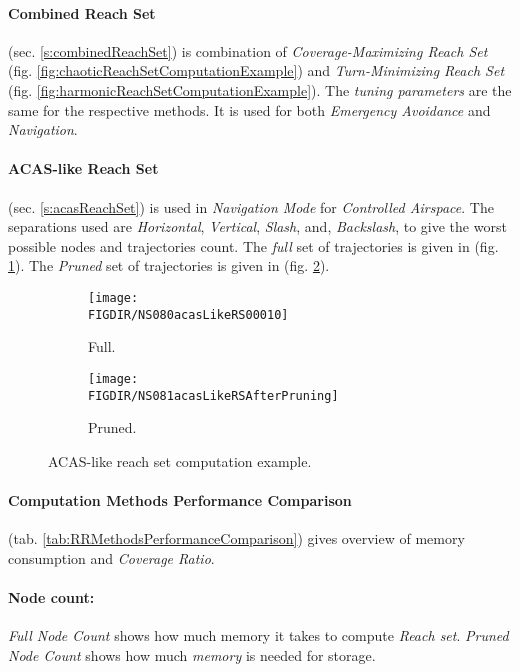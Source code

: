 \paragraph{Combined Reach Set} (sec. \ref{s:combinedReachSet}) is combination of \emph{Coverage-Maximizing Reach Set} (fig. \ref{fig:chaoticReachSetComputationExample}) and \emph{Turn-Minimizing Reach Set} (fig. \ref{fig:harmonicReachSetComputationExample}). The \emph{tuning parameters} are the same for the respective methods. It is used for both \emph{Emergency Avoidance} and \emph{Navigation}. 

\paragraph{ACAS-like Reach Set} (sec. \ref{s:acasReachSet}) is used in \emph{Navigation Mode} for \emph{Controlled Airspace}. The separations used are \emph{Horizontal}, \emph{Vertical}, \emph{Slash}, and, \emph{Backslash}, to give the worst possible nodes and trajectories count. The \emph{full} set of trajectories is given in (fig. \ref{fig:acasLikeComputed}). The \emph{Pruned} set of trajectories is given in (fig. \ref{fig:acasLikePruned}).

\begin{figure}[H]
    \centering
    \begin{subfigure}{0.48\textwidth}
    	\centering
        \texttt{[image: \\FIGDIR/NS080acasLikeRS00010]}
        \caption{Full.}
        \label{fig:acasLikeComputed}
    \end{subfigure}
    \begin{subfigure}{0.48\textwidth}
    	\centering
        \texttt{[image: \\FIGDIR/NS081acasLikeRSAfterPruning]} 
        \caption{Pruned.}
        \label{fig:acasLikePruned}
    \end{subfigure}
    \caption{ACAS-like reach set computation example.}
    \label{fig:acasLikeReachSetComputationExample}
\end{figure}


\paragraph{Computation Methods Performance Comparison} (tab. \ref{tab:RRMethodsPerformanceComparison})  gives overview of memory consumption and \emph{Coverage Ratio}.

\paragraph{Node count:} \emph{Full Node Count} shows how much memory it takes to compute \emph{Reach set}. \emph{Pruned Node Count} shows how much \emph{memory} is needed for storage. 


